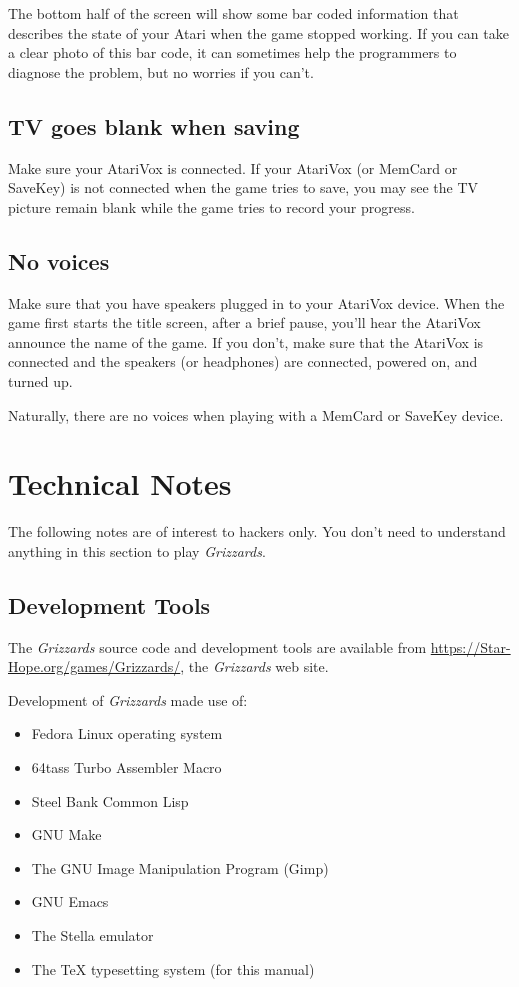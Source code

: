 \documentclass[12pt,twoside,openright,book]{memoir}
\begin{document}
\begin{description}
The bottom half of the screen will show some bar coded information
that describes the state of your Atari when the game stopped
working. If you can take a clear photo of this bar code, it can
sometimes help the  programmers to diagnose the problem,  but no worries
if you can't.

\section{TV goes blank when saving}

Make sure  your AtariVox is connected.  If your AtariVox (or  MemCard or
SaveKey) is not connected  when the game tries to save,  you may see the
TV picture remain blank while the game tries to record your progress.

\section{No voices}

Make sure  that you have  speakers plugged  in to your  AtariVox device.
When the game first starts the title screen, after a brief pause, you'll
hear the AtariVox announce the name of the game. If you don't, make sure
that  the AtariVox  is connected  and the  speakers (or  headphones) are
connected, powered on, and turned up.

Naturally,  there  are  no  voices   when  playing  with  a  MemCard  or
SaveKey device. 

\chapter{Technical Notes}

The following notes are of interest to hackers only. You don't need to
understand anything in this section to play \textit{Grizzards}.

\section{Development Tools}

The \textit{Grizzards}  source code and development  tools are available
from
\href{https://Star-Hope.org/games/Grizzards/}{https://Star-Hope.org/games/Grizzards/},
the \textit{Grizzards} web site.

Development of \textit{Grizzards} made use of:

\begin{itemize}
\item Fedora Linux\registered{} operating system
\item 64tass Turbo Assembler Macro
\item Steel Bank Common Lisp
\item GNU Make
\item The GNU Image Manipulation Program (Gimp)
\item GNU Emacs
\item The Stella emulator
\item The \TeX{} typesetting system (for this manual)
\end{itemize}


\end{description}
\end{document}
